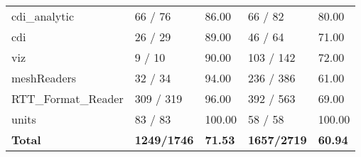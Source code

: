 \begin{table}
\begin{center}
\begin{tabular}{lllll}
      cdi\_analytic   &       66      /       76      &       86.00   &       66      /       82      &       80.00   \\
      cdi    &       26      /       29      &       89.00   &       46      /       64      &       71.00   \\
      viz    &       9       /       10      &       90.00   &       103     /       142     &       72.00   \\
      meshReaders    &       32      /       34      &       94.00   &       236     /       386     &       61.00   \\
      RTT\_Format\_Reader      &       309     /       319     &       96.00   &       392     /       563     &       69.00   \\
      units  &       83      /       83      &       100.00  &       58      /       58      &       100.00  \\
      \hline
      {\bf Total} & {\bf 1249/1746} & {\bf 71.53} & {\bf 1657/2719} &
      {\bf 60.94} \\

      \hline\hline
    \end{tabular}
  \end{center}
\end{table}

